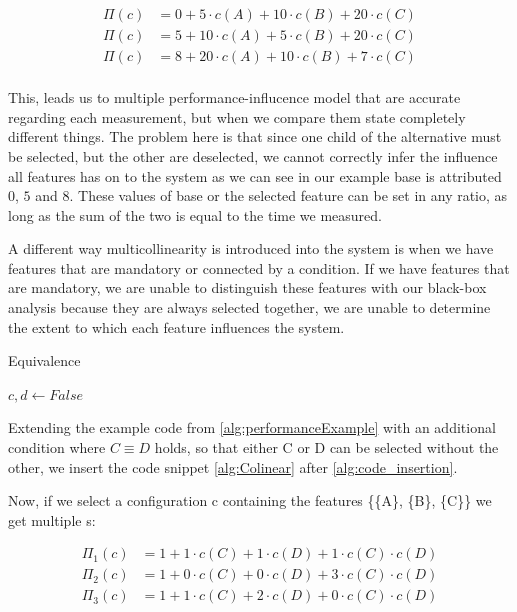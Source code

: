 \begin{align*}
    \Pi(c) &= 0 + 5 \cdot c(A) + 10\cdot c(B) + 20\cdot c(C) \\
    \Pi(c) &= 5 + 10 \cdot c(A) + 5\cdot c(B) + 20\cdot c(C) \\
    \Pi(c) &= 8 + 20 \cdot c(A) + 10\cdot c(B) + 7\cdot c(C) \\
\end{align*}

This, leads us to multiple performance-influcence model that are accurate regarding each measurement, but when we
compare them state completely different things. 
The problem here is that since one child of the alternative must be selected, but the other are deselected, we cannot correctly infer the influence
all features has on to the system as we can see in our example base is attributed $0$, $5$ and $8$. 
These values of base or the selected feature can be set in any ratio, as long as the sum of the two is equal to the time we measured.

A different way multicollinearity is introduced into the system is when we have features that are mandatory or connected by a condition. 
If we have features that are mandatory, we are unable to distinguish these features with our black-box analysis because they are always selected
together, we are unable to determine the extent to which each feature influences the system. \cite{Multicollinearity}

\begin{algorithm}[h]
    \caption{Equivalence \label{alg:Colinear}}
    \begin{algorithmic}[1]

        \State $c,d \gets False$
    \EndIf

    \end{algorithmic}
    \end{algorithm}

Extending the example code from \ref{alg:performanceExample} with an additional condition where $C \equiv D$ holds, so that 
either C or D can be selected without the other, we insert the code snippet \ref{alg:Colinear} after \ref{alg:code_insertion}.

Now, if we select a configuration c containing the features \{\{A\}, \{B\}, \{C\}\} we get multiple {\perfInfluenceModel}s:

\begin{align*}
    \Pi_1(c) &= 1 + 1\cdot c(C) + 1 \cdot c(D) + 1\cdot c(C) \cdot c(D) \\
    \Pi_2(c) &= 1 + 0\cdot c(C) + 0 \cdot c(D) + 3\cdot c(C) \cdot c(D) \\
    \Pi_3(c) &= 1 + 1\cdot c(C) + 2 \cdot c(D) + 0\cdot c(C) \cdot c(D) \\
\end{align*}

